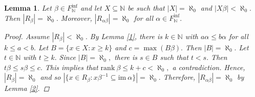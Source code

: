 \documentclass[11pt]{article}
\theoremstyle{plain}
\newtheorem{lemma}[theorem]{Lemma}
\theoremstyle{definition}
\newcommand{\rank}{\mathrm{rank~}}
\newcommand{\im}{\mathrm{im~}}
\begin{document}
\begin{lemma}\label{beforeideal}
Let $\beta\in F_{\mathbb{N}}^{\inf}$ and let $X\subseteq\mathbb{N}$ be such that $\left\vert X\right\vert=\aleph_{0}$ and $\left\vert X\beta\right\vert<\aleph_{0}.$ Then $\left\vert R_{\beta}\right\vert=\aleph_{0}.$ Moreover, $\left\vert R_{\alpha\beta}\right\vert=\aleph_{0}$ for all $\alpha\in F_{\mathbb{N}}^{\inf}.$
\begin{proof}
Assume $\left\vert R_{\beta}\right\vert<\aleph_{0}.$ By Lemma \ref{1}, there is $k\in\mathbb{N}$ with $a\alpha\leq b\alpha$ for all $k\leq a<b.$ Let $B=\{x\in X:x\geq k\}$ and $c=\max (B\beta).$ Then $\left\vert B\right\vert=\aleph_{0}.$ Let $t\in\mathbb{N}$ with $t\geq k.$ Since $\left\vert B\right\vert=\aleph_{0},$ there is $s\in B$ such that $t<s.$ Then $t\beta\leq s\beta\leq c.$ This implies that $\rank\beta\leq k+c<\aleph_{0},$ a contradiction. Hence, $\left\vert R_{\beta}\right\vert=\aleph_{0}$ and so $\left\vert\{x\in R_{\beta}:x\beta^{-1}\subseteq\im\alpha\}\right\vert=\aleph_{0}.$ Therefore, $\left\vert R_{\alpha\beta}\right\vert=\aleph_{0}$ by Lemma \ref{2}.
\end{proof}
\end{lemma}
\end{document}
